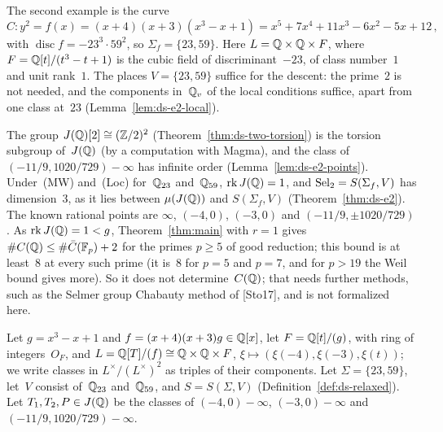 \begin{remark}[E2: rank~$1$]
\label{rem:ds-e2}
The second example is the curve
\[ C \colon y^2 = f(x) = (x + 4)(x + 3)(x^3 - x + 1) = x^5 + 7x^4 + 11x^3 - 6x^2 - 5x + 12\,, \]
with $\operatorname{disc} f = -23^3 \cdot 59^2$, so $\Sigma_f = \{23, 59\}$. Here
$L = \mathbb{Q} \times \mathbb{Q} \times F$, where $F = \mathbb{Q}[t]/(t^3 - t + 1)$ is the cubic field of
discriminant~$-23$, of class number~$1$ and unit rank~$1$. The places $V = \{23, 59\}$ suffice for
the descent: the prime~$2$ is not needed, and the components in~$\mathbb{Q}_v$ of the local conditions
suffice, apart from one class at~$23$ (Lemma~\ref{lem:ds-e2-local}).

The group $J(\mathbb{Q})[2] \cong (\mathbb{Z}/2)^2$ (Theorem~\ref{thm:ds-two-torsion}) is the torsion subgroup
of~$J(\mathbb{Q})$ (by a computation with Magma), and the class of $(-11/9, 1020/729) - \infty$ has
infinite order (Lemma~\ref{lem:ds-e2-points}). Under~(MW) and~(Loc) for~$\mathbb{Q}_{23}$ and~$\mathbb{Q}_{59}$,
$\operatorname{rk} J(\mathbb{Q}) = 1$, and $\operatorname{Sel}_2 = S(\Sigma_f, V)$ has dimension~$3$, as it lies between
$\mu(J(\mathbb{Q}))$ and $S(\Sigma_f, V)$ (Theorem~\ref{thm:ds-e2}). The known rational points are
$\infty$, $(-4, 0)$, $(-3, 0)$ and $(-11/9, \pm 1020/729)$. As $\operatorname{rk} J(\mathbb{Q}) = 1 < g$,
Theorem~\ref{thm:main} with $r = 1$ gives $\#C(\mathbb{Q}) \le \#\bar C(\mathbb{F}_p) + 2$ for the primes
$p \ge 5$ of good reduction; this bound is at least~$8$ at every such prime (it is~$8$ for $p = 5$
and $p = 7$, and for $p > 19$ the Weil bound gives more). So it does not determine~$C(\mathbb{Q})$; that
needs further methods, such as the Selmer group Chabauty method of [Sto17], and is not formalized
here.
\end{remark}

\begin{setting}
\label{set:ds-e2}
\leanok
Let $g = x^3 - x + 1$ and $f = (x + 4)(x + 3)g \in \mathbb{Q}[x]$, let $F = \mathbb{Q}[t]/(g)$, with ring of
integers~$O_F$, and $L = \mathbb{Q}[T]/(f) \cong \mathbb{Q} \times \mathbb{Q} \times F$,
$\xi \mapsto (\xi(-4), \xi(-3), \xi(t))$; we write classes in $L^\times/(L^\times)^2$ as triples
of their components. Let $\Sigma = \{23, 59\}$, let~$V$ consist of~$\mathbb{Q}_{23}$ and~$\mathbb{Q}_{59}$, and
$S = S(\Sigma, V)$ (Definition~\ref{def:ds-relaxed}). Let $T_1, T_2, P \in J(\mathbb{Q})$ be the classes
of $(-4, 0) - \infty$, $(-3, 0) - \infty$ and $(-11/9, 1020/729) - \infty$.
\end{setting}

